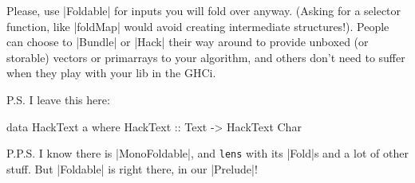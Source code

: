 Please, use |Foldable| for inputs you will fold over anyway.
(Asking for a selector function, like |foldMap| would avoid creating intermediate structures!).
People can choose to |Bundle| or |Hack| their way around to provide unboxed (or storable) vectors or
primarrays to your algorithm, and others don't need to suffer when they play with your lib in the GHCi.


P.S. I leave this here:

\begin{code}
data HackText a where
    HackText :: Text -> HackText Char
\end{code}

P.P.S. I know there is |MonoFoldable|, and \texttt{lens} with its |Fold|s and a lot of other stuff. But |Foldable| is right there, in our |Prelude|!
